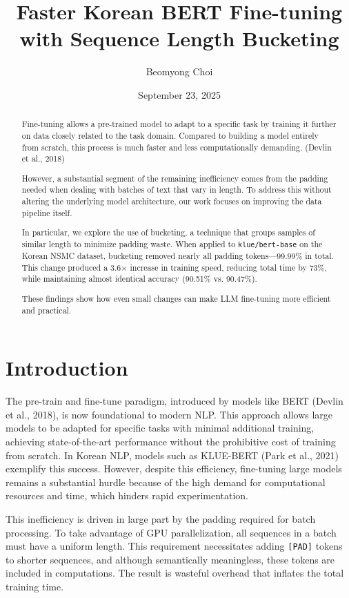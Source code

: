 \documentclass{article}
\title{Faster Korean BERT Fine-tuning with Sequence Length Bucketing}
\author{Beomyong Choi}
\date{September 23, 2025} %
\begin{document}

\maketitle

\begin{abstract}
Fine-tuning allows a pre-trained model to adapt to a specific task by training it further on data closely related to the task domain. Compared to building a model entirely from scratch, this process is much faster and less computationally demanding. (Devlin et al., 2018)

However, a  substantial segment of the remaining inefficiency comes from the padding needed when dealing with batches of text that vary in length. To address this without altering the underlying model architecture, our work focuses on improving the data pipeline itself.

In particular, we explore the use of bucketing, a technique that groups samples of similar length to minimize padding waste. When applied to \texttt{klue/bert-base} on the Korean NSMC dataset, bucketing removed nearly all padding tokens—99.99\% in total. This change produced a 3.6$\times$ increase in training speed, reducing total time by 73\%, while maintaining almost identical accuracy (90.51\% vs. 90.47\%).

These findings show how even small changes can make LLM fine-tuning more efficient and practical.
\end{abstract}

\section{Introduction}

The pre-train and fine-tune paradigm, introduced by models like BERT (Devlin et al., 2018), is now foundational to modern NLP. This approach allows large models to be adapted for specific tasks with minimal additional training, achieving state-of-the-art performance without the prohibitive cost of training from scratch. In Korean NLP, models such as KLUE-BERT (Park et al., 2021) exemplify this success. However, despite this efficiency, fine-tuning large models remains a substantial hurdle because of the high demand for computational resources and time, which hinders rapid experimentation.

This inefficiency is driven in large part by the padding required for batch processing. To take advantage of GPU parallelization, all sequences in a batch must have a uniform length. This requirement necessitates adding \texttt{[PAD]} tokens to shorter sequences, and although semantically meaningless, these tokens are included in computations. The result is wasteful overhead that inflates the total training time.
\end{document}
